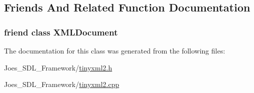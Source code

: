 \subsection{Friends And Related Function Documentation}
\hypertarget{classtinyxml2_1_1_x_m_l_comment_a4eee3bda60c60a30e4e8cd4ea91c4c6e}{
\subsubsection[{X\-M\-L\-Document}]{\setlength{\rightskip}{0pt plus 5cm}friend class {\bf X\-M\-L\-Document}\hspace{0.3cm}{\ttfamily [friend]}}}\label{classtinyxml2_1_1_x_m_l_comment_a4eee3bda60c60a30e4e8cd4ea91c4c6e}


The documentation for this class was generated from the following files\-:\begin{DoxyCompactItemize}
\item 
Joes\-\_\-\-S\-D\-L\-\_\-\-Framework/\hyperlink{tinyxml2_8h}{tinyxml2.\-h}\item 
Joes\-\_\-\-S\-D\-L\-\_\-\-Framework/\hyperlink{tinyxml2_8cpp}{tinyxml2.\-cpp}\end{DoxyCompactItemize}
